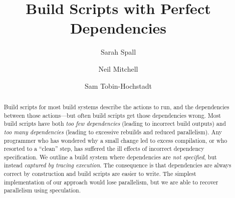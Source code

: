 \documentclass[acmsmall,screen,review,10pt]{acmart}
\begin{document}
\newcommand{\Make}{\textsc{Make}\xspace}
\newcommand{\Rattle}{\textsc{Rattle}\xspace}
\newcommand{\Fabricate}{\textsc{Fabricate}\xspace}
\newcommand{\Bazel}{\textsc{Bazel}\xspace}
\newcommand{\Buck}{\textsc{Buck}\xspace}
\newcommand{\Shake}{\textsc{Shake}\xspace}
\newcommand{\Bigbro}{\textsc{BigBro}\xspace}
\newcommand{\Fac}{\textsc{Fac}\xspace}
\newcommand{\Fsatrace}{\textsc{Fsatrace}\xspace}
\newcommand{\tracedfs}{\textsc{Traced-Fs}\xspace}
\newcommand{\BuildXL}{\textsc{BuildXL}\xspace}
\newcommand{\Nix}{\textsc{Nix}\xspace}
\newcommand{\Memoize}{\textsc{Memoize}\xspace}
\newcommand{\Stroll}{\textsc{Stroll}\xspace}

\newcommand{\postparagraphs}{\vspace{3mm}\noindent}


\title{Build Scripts with Perfect Dependencies}

\author{Sarah Spall}

\author{Neil Mitchell}

\author{Sam Tobin-Hochstadt}


\begin{abstract}
Build scripts for most build systems describe the actions to run, and the dependencies between those actions---but often build scripts get those dependencies wrong.
Most build scripts have both \emph{too few dependencies} (leading to incorrect build outputs) and \emph{too many dependencies} (leading to excessive rebuilds and reduced parallelism). Any programmer who has wondered why a small change led to excess compilation, or who resorted to a ``clean'' step, has suffered the ill effects of incorrect dependency specification.
We outline a build system where dependencies are \emph{not specified}, but instead \emph{captured by tracing execution}.
The consequence is that dependencies are always correct by construction and build scripts are easier to write.
The simplest implementation of our approach would lose parallelism, but we are able to recover parallelism using speculation.
\end{abstract}


\maketitle











\end{document}
